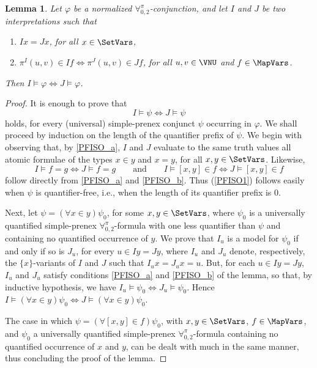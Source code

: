 \documentclass[submission,copyright,creativecommons]{eptcs}
\newtheorem{lemma}{Lemma}
\newcommand{\Lang}{\ensuremath{\mathbf{\forall}^{\pi}_{0,2}}\xspace}
\newcommand{\pairf}[1]{\pi^{#1}}
\newcommand{\inter}{I}
\newcommand{\ipairf}{\pairf{\inter}}
\newcommand{\interp}{J}
\newcommand{\ipairfp}{\pairf{\interp}}
\newcommand{\vx}{x}
\newcommand{\svx}{x}
\newcommand{\svy}{y}
\newcommand{\mvx}{f}
\newcommand{\mvy}{g}
\begin{document}
\begin{lemma}\label{PFISO}
Let $\varphi$ be a normalized \Lang-conjunction, and let $\inter$ and
$\interp$ be two interpretations such that
\begin{enumerate}[label=(\alph*)]
 \item\label{PFISO_a} $\inter \vx = \interp \vx$, for all $\vx \in 
 \SetVars$,

 \item\label{PFISO_b} $\ipairf(u,v) \in \inter \mvx \iff \ipairfp(u,v)
 \in \interp \mvx$, for all $u,v \in \VNU$ and $\mvx \in \MapVars$.
\end{enumerate}
Then $\inter \models \varphi \iff \interp \models \varphi$.
\end{lemma}
\begin{proof}
It is enough to prove that
\begin{equation}\label{PFISO1}
 \inter \models \psi \iff \interp \models \psi
\end{equation}
holds, for every (universal) simple-prenex conjunct $\psi$ occurring
in $\varphi$.  We shall proceed by induction on the length of the
quantifier prefix of $\psi$.  We begin with observing that, by
\ref{PFISO_a}, $\inter$ and $\interp$ evaluate to the same truth
values all atomic formulae of the types $\svx \in \svy$ and
$\svx=\svy$, for all $\svx, \svy \in \SetVars$.  Likewise,
\[
\inter \models \mvx=\mvy \iff \interp \models \mvx=\mvy
\qquad \text{and} \qquad
\inter \models [\svx, \svy] \in \mvx \iff \interp \models
 [\svx, \svy] \in \mvx
\]
follow directly from \ref{PFISO_a} and \ref{PFISO_b}.  Thus
(\ref{PFISO1}) follows easily when $\psi$ is quantifier-free, i.e., 
when the length of its quantifier prefix is $0$.

Next, let $\psi=(\forall \svx \in \svy)\psi_0$, for some $\svx, \svy
\in \SetVars$, where $\psi_0$ is a universally quantified
simple-prenex \Lang-formula with one less quantifier than $\psi$ and
containing no quantified occurrence of $\svy$.  We prove that
$\inter_{u}$ is a model for $\psi_0$ if and only if so is
$\interp_{u}$, for every $u \in \inter \svy = \interp \svy$, where
$\inter_{u}$ and $\interp_{u}$ denote, respectively, the $\{ \svx
\}$-variants of
$\inter$ and $\interp$ such that $\inter_{u} x =
\interp_{u} x = u$.  But, for each $u \in \inter \svy = \interp \svy$,
$\inter_{u}$ and $\interp_{u}$ satisfy conditions \ref{PFISO_a} and
\ref{PFISO_b} of the lemma, so that, by inductive hypothesis, we have
$\inter_{u} \models \psi_0 \iff \interp_{u} \models \psi_0$.  Hence
$\inter \models (\forall \svx \in \svy)\psi_0 \iff \interp \models
(\forall \svx \in \svy)\psi_0$.

The case in which $\psi=(\forall [\svx, \svy] \in \mvx)\psi_0$, with
$\svx, \svy \in \SetVars$, $\mvx \in \MapVars$, and $\psi_0$ a
universally quantified simple-prenex \Lang-formula containing no
quantified occurrence of $\svx$ and $\svy$, can be dealt with much in
the same manner, thus concluding the proof of the lemma.
\end{proof}
\end{document}
